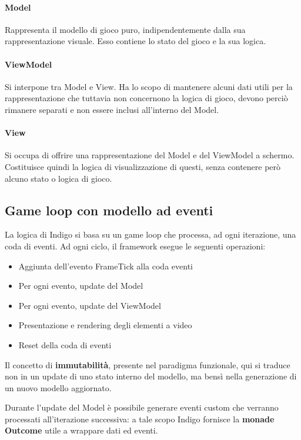 \paragraph{Model}
Rappresenta il modello di gioco puro, indipendentemente dalla sua rappresentazione visuale. 
Esso contiene lo stato del gioco e la sua logica. 

\paragraph{ViewModel}
Si interpone tra Model e View. Ha lo scopo di mantenere alcuni dati utili per la rappresentazione che tuttavia non concernono la logica di gioco, devono perciò rimanere separati e non essere inclusi all'interno del Model.

\paragraph{View}
Si occupa di offrire una rappresentazione del Model e del ViewModel a schermo. Costituisce quindi la logica di visualizzazione di questi, senza contenere però alcuno stato o logica di gioco.

\subsection{Game loop con modello ad eventi}
La logica di Indigo si basa su un game loop che processa, ad ogni iterazione, una coda di eventi. 
Ad ogni ciclo, il framework esegue le seguenti operazioni:
\begin{itemize}
    \item Aggiunta dell'evento FrameTick alla coda eventi
    \item Per ogni evento, update del Model
    \item Per ogni evento, update del ViewModel
    \item Presentazione e rendering degli elementi a video
    \item Reset della coda di eventi
\end{itemize}

Il concetto di \textbf{immutabilità}, presente nel paradigma funzionale, qui si traduce non in un update di uno stato interno del modello, ma bensì nella generazione di un nuovo modello aggiornato. 

Durante l'update del Model è possibile generare eventi custom che verranno processati all'iterazione successiva: a tale scopo Indigo fornisce la \textbf{monade Outcome} utile a wrappare dati ed eventi. 

